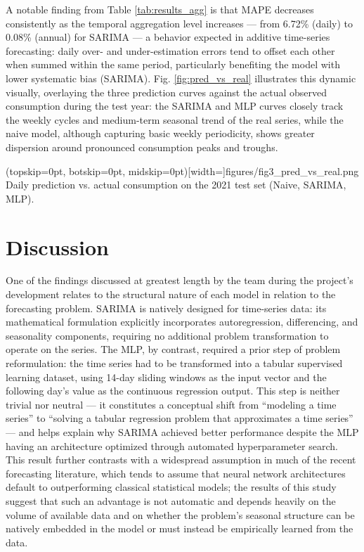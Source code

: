 \documentclass{ieeeaccess}
\begin{document}
A notable finding from Table \ref{tab:results_agg} is that MAPE decreases consistently as the temporal aggregation level increases --- from 6.72\% (daily) to 0.08\% (annual) for SARIMA --- a behavior expected in additive time-series forecasting: daily over- and under-estimation errors tend to offset each other when summed within the same period, particularly benefiting the model with lower systematic bias (SARIMA). Fig. \ref{fig:pred_vs_real} illustrates this dynamic visually, overlaying the three prediction curves against the actual observed consumption during the test year: the SARIMA and MLP curves closely track the weekly cycles and medium-term seasonal trend of the real series, while the naive model, although capturing basic weekly periodicity, shows greater dispersion around pronounced consumption peaks and troughs.


\Figure[t!](topskip=0pt, botskip=0pt, midskip=0pt)[width=\textwidth]{figures/fig3_pred_vs_real.png}
{Daily prediction vs. actual consumption on the 2021 test set (Naive, SARIMA, MLP).}

\section{Discussion}
\label{sec:discussion}
One of the findings discussed at greatest length by the team during the project's development relates to the structural nature of each model in relation to the forecasting problem. SARIMA is natively designed for time-series data: its mathematical formulation explicitly incorporates autoregression, differencing, and seasonality components, requiring no additional problem transformation to operate on the series. The MLP, by contrast, required a prior step of problem reformulation: the time series had to be transformed into a tabular supervised learning dataset, using 14-day sliding windows as the input vector and the following day's value as the continuous regression output. This step is neither trivial nor neutral --- it constitutes a conceptual shift from ``modeling a time series'' to ``solving a tabular regression problem that approximates a time series'' --- and helps explain why SARIMA achieved better performance despite the MLP having an architecture optimized through automated hyperparameter search. This result further contrasts with a widespread assumption in much of the recent forecasting literature, which tends to assume that neural network architectures default to outperforming classical statistical models; the results of this study suggest that such an advantage is not automatic and depends heavily on the volume of available data and on whether the problem's seasonal structure can be natively embedded in the model or must instead be empirically learned from the data.
\end{document}
